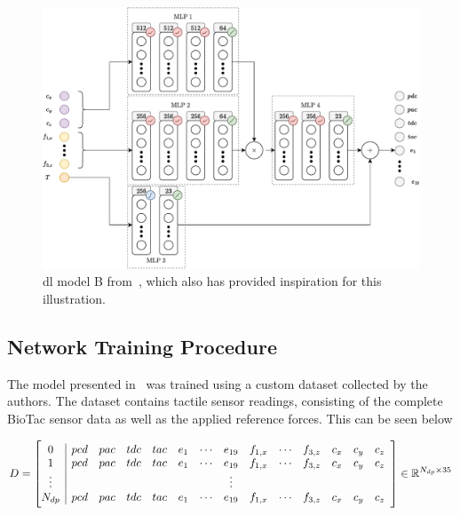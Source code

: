 \begin{figure}[h]
		\begin{center}
			\includegraphics[width=\textwidth]{chapters/1-tactile-perception/fig/dl-model-tactile-perception-grouping-crop.pdf}
		\end{center}
		\caption{\gls{dl} model B from~\cite{simulation-of-the-syntouch-biotac-sensor}, which also has provided inspiration for this illustration.}
		\label{fig:dl-model-tactile-perception}
\end{figure}


\subsection{Network Training Procedure}\label{sec:1-tactile-perception-method-network-training-procedure}

The model presented in~ was trained using a custom dataset collected by the authors. The dataset  contains  tactile sensor readings, consisting of the complete BioTac sensor data as well as the applied reference forces. This can be seen below

\begin{equation} \label{eq:dl-data-matrix}
	D =
	\left[\begin{array}{@{}c|cccccccccccccc@{}}
		0       & pcd & pac & tdc & tac & e_{1} & \cdots & e_{19} & f_{1,x} & \cdots & f_{3,z} & c_x & c_y & c_z \\
		1       & pcd & pac & tdc & tac & e_{1} & \cdots & e_{19} & f_{1,x} & \cdots & f_{3,z} & c_x & c_y & c_z \\
		\vdots  &  &  &  &  &  &  & \vdots &  &  &  &  &  &  \\
		N_{dp}  & pcd & pac & tdc & tac & e_{1} & \cdots & e_{19} & f_{1,x} & \cdots & f_{3,z} & c_x & c_y & c_z
		\end{array}\right] \inR{N_{dp} \times 35}
\end{equation}

